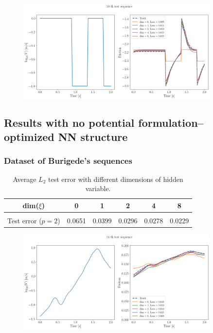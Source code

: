 \begin{figure}[H]
    \centering
    \includegraphics[width=0.9\textwidth]{images/dtTSqJump2.png}
    \label{fig:dtTSqJump2}
\end{figure}

\subsection{Results with no potential formulation--optimized NN structure}
\subsubsection{Dataset of Burigede's sequences}
\begin{table}[H]
    \centering
    \begin{tabular}{c|ccccc}
        \hline
        dim($\xi$) & 0 & 1 & 2 & 4 & 8 \\
        \hline \\[-1em]
        Test error ($p=2$) & 0.0651 & 0.0399 & 0.0296 & 0.0278 & 0.0229\\
        \hline
    \end{tabular}
    \caption{Average $L_2$ test error with different dimensions of hidden variable.}
    \label{tab:resFGBurigede}
\end{table}

\begin{figure}[H]
    \centering
    \includegraphics[width=0.9\textwidth]{images/FGBurigede1.png}
    \label{fig:FGBurigede1}
\end{figure}

